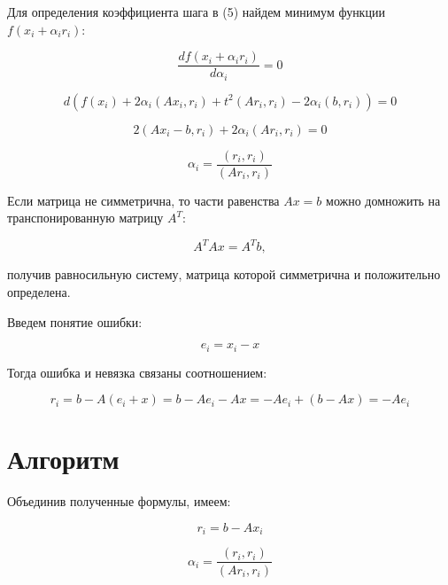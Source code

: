 \documentclass{article}
\begin{document}
Для определения коэффициента шага в (5) найдем минимум функции $f(x_i + \alpha_i r_i)$:

\begin{equation*}
    \frac{df(x_i + \alpha_i r_i)}{d\alpha_i} = 0
\end{equation*}

\begin{equation*}
    d(f(x_i) + 2\alpha_i (A x_i, r_i) + t^2 (A r_i, r_i) - 2 \alpha_i (b, r_i)) = 0
\end{equation*}

\begin{equation*}
    2(A x_i - b, r_i) + 2 \alpha_i (A r_i, r_i) = 0    
\end{equation*}

\begin{equation*}
    \alpha_i = \frac{(r_i, r_i)}{(A r_i, r_i)}
\end{equation*}

Если матрица не симметрична, то части равенства $Ax = b$ можно домножить на транспонированную матрицу $A^T$:

\begin{equation*}
    A^T A x = A^T b,
\end{equation*}

получив равносильную систему, матрица которой симметрична и положительно определена.

Введем понятие ошибки:

\begin{equation}
    e_i = x_i - x
\end{equation}

Тогда ошибка и невязка связаны соотношением:

\begin{equation}
    r_i = b - A(e_i + x) = b - A e_i - A x = -A e_i + (b - A x) = -A e_i
\end{equation}

\section{Алгоритм}

Объединив полученные формулы, имеем:

\begin{equation}
    r_i = b - Ax_i
\end{equation}

\begin{equation}
    \alpha_i = \frac{(r_i, r_i)}{(A r_i, r_i)}
\end{equation}
\end{document}
